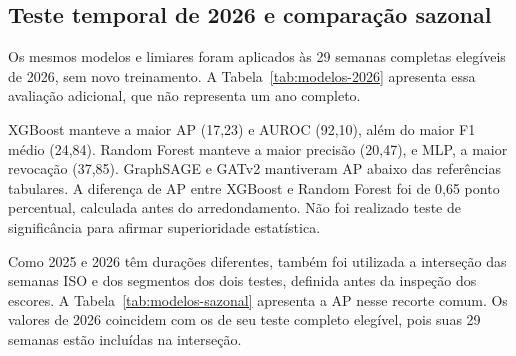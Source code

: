 \documentclass[12pt]{article}
\begin{document}
\subsection{Teste temporal de 2026 e comparação sazonal}

Os mesmos modelos e limiares foram aplicados às 29 semanas completas
elegíveis de 2026, sem novo treinamento. A
Tabela~\ref{tab:modelos-2026} apresenta essa avaliação adicional, que
não representa um ano completo.

\begin{table}[!ht]
\centering
\caption{Desempenho no recorte parcial de 2026: média $\pm$
desvio-padrão entre cinco sementes, na escala de 0 a 100.}
\label{tab:modelos-2026}
\small
\setlength{\tabcolsep}{4pt}
\end{table}

XGBoost manteve a maior AP (17,23) e AUROC (92,10), além do maior F1
médio (24,84). Random Forest manteve a maior precisão (20,47), e
MLP, a maior revocação (37,85). GraphSAGE e GATv2 mantiveram AP abaixo
das referências tabulares. A diferença de AP entre XGBoost e Random
Forest foi de 0,65 ponto percentual, calculada antes do
arredondamento. Não foi realizado teste de significância para afirmar
superioridade estatística.

Como 2025 e 2026 têm durações diferentes, também foi utilizada a
interseção das semanas ISO e dos segmentos dos dois testes, definida
antes da inspeção dos escores. A Tabela~\ref{tab:modelos-sazonal}
apresenta a AP nesse recorte comum. Os valores de 2026 coincidem com
os de seu teste completo elegível, pois suas 29 semanas estão
incluídas na interseção.
\end{document}
